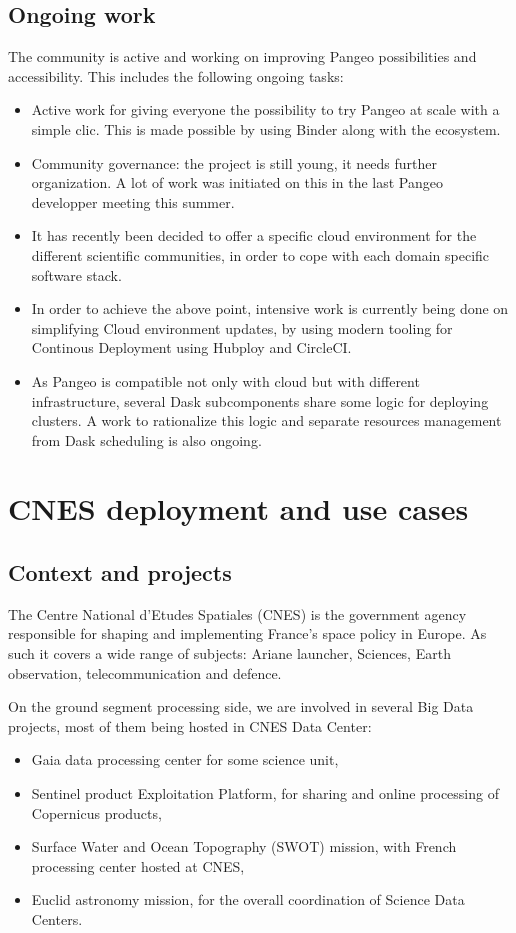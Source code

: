 \documentclass{article}
\begin{document}
\subsection{Ongoing work}
\label{ssec:ongowork}

The community is active and working on improving Pangeo possibilities and accessibility. This includes the following ongoing tasks:\begin{itemize}
\item Active work for giving everyone the possibility to try Pangeo at scale with a simple clic. This is made possible by using Binder along with the ecosystem\cite{b8}.
\item Community governance: the project is still young, it needs further organization. A lot of work was initiated on this in the last Pangeo developper meeting this summer.
\item It has recently been decided to offer a specific cloud environment for the different scientific communities, in order to cope with each domain specific software stack.
\item In order to achieve the above point, intensive work is currently being done on simplifying Cloud environment updates, by using modern tooling for Continous Deployment using Hubploy and CircleCI.
\item As Pangeo is compatible not only with cloud but with different infrastructure, several Dask subcomponents share some logic for deploying clusters. A work to rationalize this logic and separate resources management from Dask scheduling is also ongoing.
\end{itemize}

\section{CNES deployment and use cases}
\label{sec:cnes}

\subsection{Context and projects}
\label{ssec:context}

The Centre National d'Etudes Spatiales (CNES) is the government agency responsible for shaping and implementing France's space policy in Europe. As such it covers a wide range of subjects: Ariane launcher, Sciences, Earth observation, telecommunication and defence.

On the ground segment processing side, we are involved in several Big Data projects, most of them being hosted in CNES Data Center:
\begin{itemize}
\item Gaia data processing center for some science unit,
\item Sentinel product Exploitation Platform, for sharing and online processing of Copernicus products,
\item Surface Water and Ocean Topography (SWOT) mission, with French processing center hosted at CNES,
\item Euclid astronomy mission, for the overall coordination of Science Data Centers.
\end{itemize}
\end{document}
